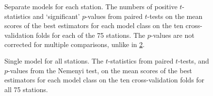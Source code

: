 

\begin{table}
  \centering
  \begin{subfigure}{\textwidth}
    \centering
    
    \caption{Separate models for each station.
      The numbers of positive $t$-statistics and `significant' $p$-values from paired
      $t$-tests on the mean scores of the best estimators for each model class on the ten
      cross-validation folds for each of the 75 stations.
      The $p$-values are not corrected for multiple comparisons, unlike in
      \cref{tab:t-tests-sub-task-1b}.
    }
    \label{tab:t-tests-sub-task-1a}
  \end{subfigure}
  \subfigurespace
  \begin{subfigure}{\textwidth}
    \centering
    
    \caption{Single model for all stations.
      The $t$-statistics from paired $t$-tests, and $p$-values from the Nemenyi test, on the
      mean scores of the best estimators for each model class on the ten cross-validation
      folds for all 75 stations.
    }
    \label{tab:t-tests-sub-task-1b}
  \end{subfigure}
  \caption{The results of statistical tests on the scores achieved by the best
    estimators for each model class.
    A positive $t$-statistic indicates that `Model B' achieved a lower mean score than
    `Model A'.
  }
  \label{tab:sub-task-1:t-tests}
\end{table}
